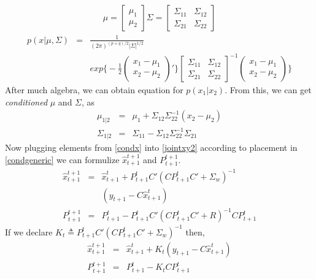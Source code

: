 \begin{eqnarray}
\mu = 
\left[ \begin{array}{c}
      \mu_1 \\
      \mu_2
      \end{array} \right]           
\Sigma = 
\left[ \begin{array}{cc}
      \Sigma_{11} & \Sigma_{12}\\
      \Sigma_{21} & \Sigma_{22}
      \end{array} \right] \label{condgeneric}
\end{eqnarray}
\begin{eqnarray*}
p(x|\mu,\Sigma) &=& \frac{1}{(2\pi)^{(p+q)/2}|\Sigma|^{1/2}} \\
&& exp\bigg\{
-\frac{1}{2}
\left( \begin{array}{c}
      x_1 - \mu_1 \\
      x_2 - \mu_2
      \end{array} \right)'
\bigg\}
\left[ \begin{array}{cc}
      \Sigma_{11} & \Sigma_{12}\\
      \Sigma_{21} & \Sigma_{22}
      \end{array} \right]^{-1}
\left( \begin{array}{c}
      x_1 - \mu_1 \\
      x_2 - \mu_2
      \end{array} \right)
\bigg\} 
\end{eqnarray*}
After much algebra, we can obtain equation for $p(x_1|x_2)$. From this, we can
get {\em conditioned} $\mu$ and $\Sigma$, as
\begin{eqnarray}
\mu_{1|2} &=& \mu_1 + \Sigma_{12}\Sigma_{22}^{-1}(x_2 - \mu_2) \label{condx} \\
\Sigma_{1|2} &=& \Sigma_{11}-\Sigma_{12}\Sigma_{22}^{-1}\Sigma_{21} \nonumber
\end{eqnarray}
Now plugging elements from  \eqref{condx} into \eqref{jointxy2} according
to placement in \eqref{condgeneric} we can formulize $\hat{x}_{t+1}^{t+1}$ and
$P_{t+1}^{t+1}$. 
\begin{eqnarray*}
\hat{x}_{t+1}^{t+1} &=& \hat{x}_{t+1}^t + P_{t+1}^tC'
                  (CP_{t+1}^tC'+ \Sigma_{w})^{-1} \\
               &&   (y_{t+1} - C\hat{x}_{t+1}^t) \\
P_{t+1}^{t+1} &=& P_{t+1}^t - P_{t+1}^tC' (CP_{t+1}^tC' + R)^{-1}CP_{t+1}^t
\end{eqnarray*}
If we declare $K_t \triangleq P_{t+1}^tC' (CP_{t+1}^tC'+ \Sigma_{w})^{-1}$ then,
\begin{eqnarray}
\hat{x}_{t+1}^{t+1} &=& \hat{x}_{t+1}^t + K_t (y_{t+1} -
C\hat{x}_{t+1}^t) \label{xtplus1} \\
P_{t+1}^{t+1} &=& P_{t+1}^t - K_t C P_{t+1}^t
\end{eqnarray}

